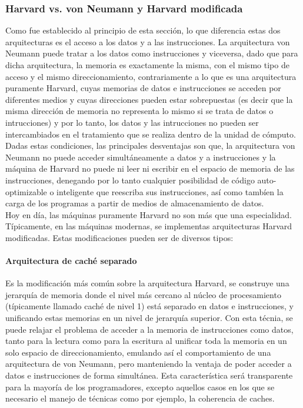 \subsubsection{Harvard vs. von Neumann y Harvard modificada}

Como fue establecido al principio de esta sección, lo que diferencia estas dos arquitecturas es el acceso a los datos y a las instrucciones. La arquitectura von Neumann puede tratar a los datos como instrucciones y viceversa, dado que para dicha arquitectura, la memoria es exactamente la misma, con el mismo tipo de acceso y el mismo direccionamiento, contrariamente a lo que es una arquitectura puramente Harvard, cuyas memorias de datos e instrucciones se acceden por diferentes medios y cuyas direcciones pueden estar sobrepuestas (es decir que la misma dirección de memoria no representa lo mismo si se trata de datos o intrucciones) y por lo tanto, los datos y las intrucciones no pueden ser intercambiados en el tratamiento que se realiza dentro de la unidad de cómputo. Dadas estas condiciones, las principales desventajas son que, la arquitectura von Neumann no puede acceder simultáneamente a datos y a instrucciones y la máquina de Harvard no puede ni leer ni escribir en el espacio de memoria de las instrucciones, denegando por lo tanto cualquier posibilidad de código auto-optimizable o inteligente que reescriba sus instrucciones, así como tambíen la carga de los programas a partir de medios de almacenamiento de datos.\\
Hoy en día, las máquinas puramente Harvard no son más que una especialidad. Típicamente, en las máquinas modernas, se implementas arquitecturas Harvard modificadas. Estas modificaciones pueden ser de diversos tipos:

\paragraph{Arquitectura de caché separado}

Es la modificación más común sobre la arquitectura Harvard, se construye una jerarquía de memoria donde el nivel más cercano al núcleo de procesamiento (típicamente llamado caché de nivel 1) está separado en datos e instrucciones, y unificando estas memorias en un nivel de jerarquía superior. Con esta técnia, se puede relajar el problema de acceder a la memoria de instrucciones como datos, tanto para la lectura como para la escritura al unificar toda la memoria en un solo espacio de direccionamiento, emulando así el comportamiento de una arquitectura de von Neumann, pero manteniendo la ventaja de poder acceder a datos e instrucciones de forma simultánea. Esta característica será transparente para la mayoría de los programadores, excepto aquellos casos en los que se necesario el manejo de técnicas como por ejemplo, la coherencia de caches.

